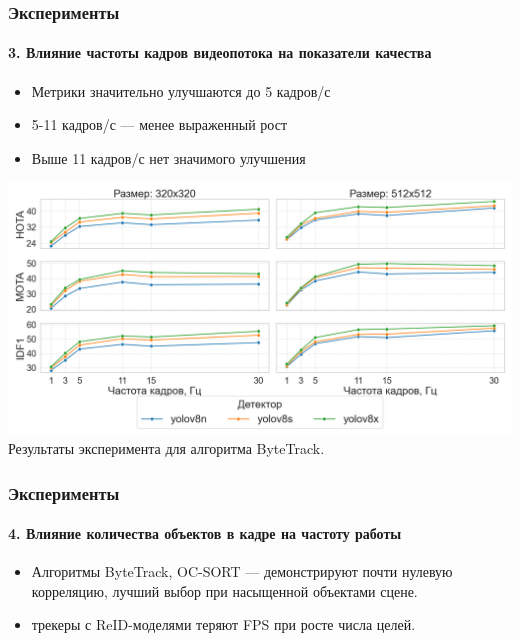 \documentclass{beamer} %
\begin{document}
\begin{frame}
  \frametitle{Эксперименты}
  \framesubtitle{3. Влияние частоты кадров видеопотока на показатели качества}
  \begin{itemize}
    \item Метрики значительно улучшаются до 5 кадров/с
    \item 5-11 кадров/с — менее выраженный рост
    \item Выше 11 кадров/с нет значимого улучшения
  \end{itemize}
  \centering
  \includegraphics[width=0.7\linewidth]{images/plots/fps_vs_metric/ByteTrack.png}\\
  \small Результаты эксперимента для алгоритма ByteTrack.
\end{frame}

\begin{frame}
  \frametitle{Эксперименты}
  \framesubtitle{4. Влияние количества объектов в кадре на частоту работы}
  
  \begin{itemize}
    \item Алгоритмы ByteTrack, OC-SORT — демонстрируют почти нулевую корреляцию, лучший выбор при насыщенной объектами сцене.
    \item трекеры с ReID-моделями теряют FPS при росте числа целей.
  \end{itemize}

\end{frame}
\end{document}
